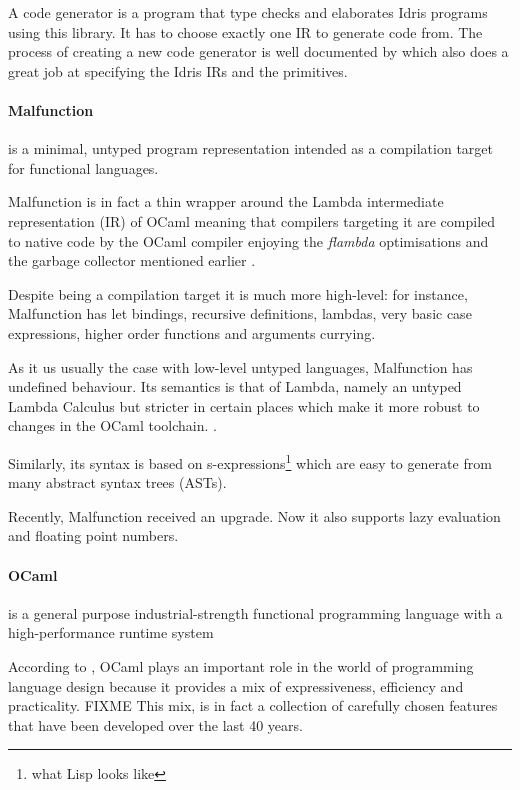\documentclass[a4paper,11pt,twocolumn]{article}
\begin{document}
A code generator is a program that type checks and elaborates
Idris programs using this library.
It has to choose exactly one
IR to generate code from.
The process of creating a new code generator is well
documented by \cite{ElliottIdrisErlang} which also does a great job
at specifying the Idris IRs and the primitives.


\paragraph{Malfunction}
is a minimal, untyped program representation intended as a
compilation target for functional languages.

Malfunction is in fact a thin wrapper around the Lambda intermediate
representation (IR) of OCaml meaning that compilers targeting it
are compiled to native code by the OCaml compiler enjoying the
\emph{flambda} optimisations and the garbage collector mentioned
earlier \cite{dolan2016malfunctional}.

Despite being a compilation target it is much more high-level:
for instance, Malfunction has
let bindings, recursive definitions, lambdas, very basic case
expressions, higher order functions and arguments currying.

As it us usually the case with low-level untyped languages, Malfunction
has undefined behaviour.
Its semantics is that of Lambda, namely an untyped Lambda Calculus but
stricter in certain places which make it more robust to changes in the
OCaml toolchain. \cite{dolan2016malfunctional}.

Similarly, its syntax is based on s-expressions\footnote{
    what Lisp looks like
} which are easy to generate from many abstract syntax trees (ASTs).

Recently, Malfunction received an upgrade.
Now it also supports lazy evaluation and
floating point numbers.


\paragraph{OCaml} is a general purpose industrial-strength functional
programming language with a high-performance runtime system

According to \cite{rwocaml}, OCaml plays an important role in the
world of programming language design because it provides a mix
of expressiveness, efficiency and practicality.
FIXME This mix, is in fact a collection of carefully chosen features
that have been developed over the last 40 years.
\end{document}
